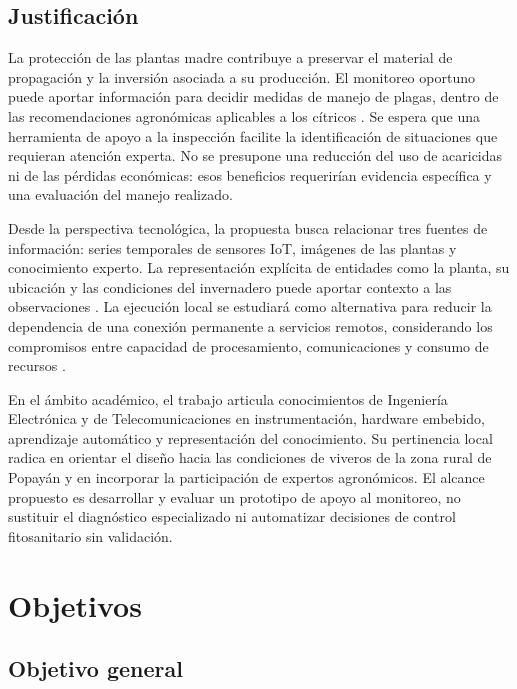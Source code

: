 \subsection{Justificación}
\label{sec:justificacion}

La protección de las plantas madre contribuye a preservar el material de
propagación y la inversión asociada a su producción. El monitoreo oportuno
puede aportar información para decidir medidas de manejo de plagas, dentro de
las recomendaciones agronómicas aplicables a los cítricos
\cite{ica2019resolucion,dimasi_inta}. Se espera que una herramienta de apoyo a
la inspección facilite la identificación de situaciones que requieran atención
experta. No se presupone una reducción del uso de acaricidas ni de las pérdidas
económicas: esos beneficios requerirían evidencia específica y una evaluación
del manejo realizado.

Desde la perspectiva tecnológica, la propuesta busca relacionar tres fuentes
de información: series temporales de sensores IoT, imágenes de las plantas y
conocimiento experto. La representación explícita de entidades como la planta,
su ubicación y las condiciones del invernadero puede aportar contexto a las
observaciones \cite{umar2024ontology}. La ejecución local se estudiará como
alternativa para reducir la dependencia de una conexión permanente a servicios
remotos, considerando los compromisos entre capacidad de procesamiento,
comunicaciones y consumo de recursos \cite{yu2025}.

En el ámbito académico, el trabajo articula conocimientos de Ingeniería
Electrónica y de Telecomunicaciones en instrumentación, hardware embebido,
aprendizaje automático y representación del conocimiento. Su pertinencia local
radica en orientar el diseño hacia las condiciones de viveros de la zona rural
de Popayán y en incorporar la participación de expertos agronómicos. El alcance
propuesto es desarrollar y evaluar un prototipo de apoyo al monitoreo, no
sustituir el diagnóstico especializado ni automatizar decisiones de control
fitosanitario sin validación.

\section{Objetivos}
\label{sec:objetivos}

\subsection{Objetivo general}
\label{subsec:obj-general}

